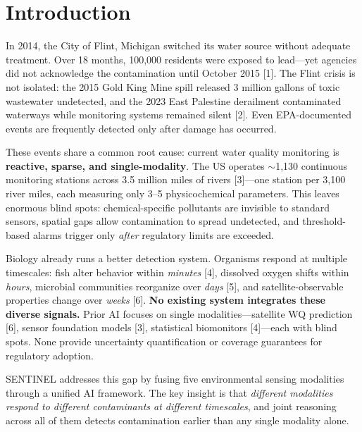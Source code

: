 \documentclass[12pt]{article}
\begin{document}
\section{Introduction}

In 2014, the City of Flint, Michigan switched its water source without adequate treatment. Over 18 months, 100,000 residents were exposed to lead---yet agencies did not acknowledge the contamination until October 2015 [1]. The Flint crisis is not isolated: the 2015 Gold King Mine spill released 3 million gallons of toxic wastewater undetected, and the 2023 East Palestine derailment contaminated waterways while monitoring systems remained silent [2]. Even EPA-documented events are frequently detected only after damage has occurred.

These events share a common root cause: current water quality monitoring is \textbf{reactive, sparse, and single-modality}. The US operates $\sim$1,130 continuous monitoring stations across 3.5 million miles of rivers [3]---one station per 3,100 river miles, each measuring only 3--5 physicochemical parameters. This leaves enormous blind spots: chemical-specific pollutants are invisible to standard sensors, spatial gaps allow contamination to spread undetected, and threshold-based alarms trigger only \textit{after} regulatory limits are exceeded.

Biology already runs a better detection system. Organisms respond at multiple timescales: fish alter behavior within \textit{minutes} [4], dissolved oxygen shifts within \textit{hours}, microbial communities reorganize over \textit{days} [5], and satellite-observable properties change over \textit{weeks} [6]. \textbf{No existing system integrates these diverse signals.} Prior AI focuses on single modalities---satellite WQ prediction [6], sensor foundation models [3], statistical biomonitors [4]---each with blind spots. None provide uncertainty quantification or coverage guarantees for regulatory adoption.

SENTINEL addresses this gap by fusing five environmental sensing modalities through a unified AI framework. The key insight is that \textit{different modalities respond to different contaminants at different timescales}, and joint reasoning across all of them detects contamination earlier than any single modality alone.
\end{document}
